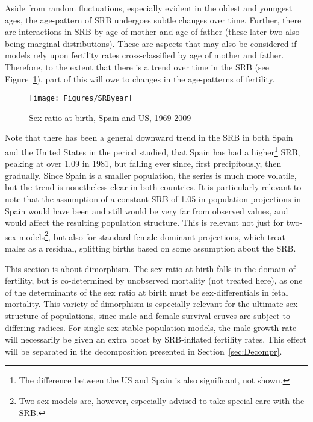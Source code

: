 Aside from random fluctuations, especially evident in the oldest and youngest
ages, the age-pattern of SRB undergoes subtle changes over time. Further, there
are interactions in SRB by age of mother and age of father (these later two
also being marginal distributions). These are aspects that may also be
considered if models rely upon fertility rates cross-classified by age of mother
and father. Therefore, to the extent that there is a trend over time in the SRB
(see Figure~\ref{fig:SRByears}), part of this will owe to changes in the
age-patterns of fertility.

\begin{figure}[ht!]
        \centering  
          \caption{Sex ratio at birth, Spain
          and US, 1969-2009}
           \texttt{[image: Figures/SRByear]}
          \label{fig:SRByears}
\end{figure}

Note that there has been a general downward trend in the SRB in both Spain and
the United States in the period studied, that Spain has had a
higher\footnote{The difference between the US and Spain is also significant, not
shown.} SRB, peaking at over 1.09 in 1981, but falling ever since, first
precipitously, then gradually. Since Spain is a smaller population, the series
is much more volatile, but the trend is nonetheless clear in both countries. It is particularly relevant to note that
the assumption of a constant SRB of 1.05 in population projections in Spain
would have been and still would be very far from observed values, and would 
affect the resulting population structure. This is relevant not
just for two-sex models\footnote{Two-sex models are, however, especially advised
to take special care with the SRB.}, but also for standard female-dominant
projections, which treat males as a residual, splitting births based on some
assumption about the SRB.

This section is about dimorphism. The sex ratio at birth
falls in the domain of fertility, but is co-determined by unobserved mortality
(not treated here), as one of the determinants of the sex ratio at birth must be
sex-differentials in fetal mortality. This variety of dimorphism is especially relevant for the ultimate
sex structure of populations, since male and female survival cruves are subject 
to differing radices. For single-sex stable population models, the male growth
rate will necessarily be given an extra boost by SRB-inflated fertility
rates. This effect will be separated in the decomposition presented in
Section~\ref{sec:Decompr}.
